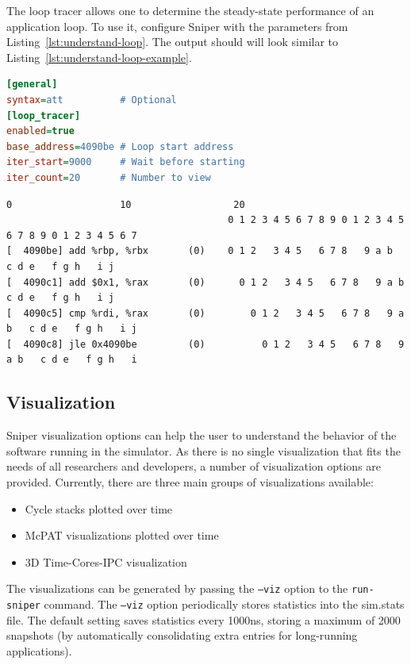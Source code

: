 \documentclass[a4paper,11pt,titlepage]{article}
\newcommand{\cmd}[1]{{\tt #1}}
\begin{document}
The loop tracer allows one to determine the steady-state performance of an application loop.  To use it, configure Sniper
with the parameters from Listing~\ref{lst:understand-loop}.  The output should will look similar to
Listing~\ref{lst:understand-loop-example}.

\begin{lstlisting}[label=lst:understand-loop,caption=Loop Tracer Setup,rulecolor=\color{DarkSlateBlue},language=ini]
[general]
syntax=att          # Optional
[loop_tracer]
enabled=true
base_address=4090be # Loop start address
iter_start=9000     # Wait before starting
iter_count=20       # Number to view
\end{lstlisting}

\begin{lstlisting}[label=lst:understand-loop-example,caption=Loop Tracer Output,rulecolor=\color{DarkSlateBlue},basicstyle=\tiny\ttfamily]
                                       0                   10                  20
                                       0 1 2 3 4 5 6 7 8 9 0 1 2 3 4 5 6 7 8 9 0 1 2 3 4 5 6 7
[  4090be] add %rbp, %rbx       (0)    0 1 2   3 4 5   6 7 8   9 a b   c d e   f g h   i j
[  4090c1] add $0x1, %rax       (0)      0 1 2   3 4 5   6 7 8   9 a b   c d e   f g h   i j
[  4090c5] cmp %rdi, %rax       (0)        0 1 2   3 4 5   6 7 8   9 a b   c d e   f g h   i j
[  4090c8] jle 0x4090be         (0)          0 1 2   3 4 5   6 7 8   9 a b   c d e   f g h   i
\end{lstlisting}

\subsection{Visualization}

Sniper visualization options can help the user to understand the behavior of the software running in the simulator.
As there is no single visualization that fits the needs of all researchers and developers,
a number of visualization options are provided.
Currently, there are three main groups of visualizations available:
\begin{itemize}
  \item Cycle stacks plotted over time
  \item McPAT visualizations plotted over time
  \item 3D Time-Cores-IPC visualization

\end{itemize}
The visualizations can be generated by passing the \cmd{--viz} option to the \cmd{run-sniper} command. The \cmd{--viz}
option periodically stores statistics into the sim.stats file. The default setting saves statistics every 1000ns, storing
a maximum of 2000 snapshots (by automatically consolidating extra entries for long-running applications).
\end{document}
